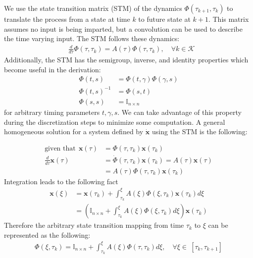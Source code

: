 We use the state transition matrix (STM) of the dynamics $\Phi(\tau_{k+1},\tau_k)$ to translate the process from a state at time $k$ to future state at $k+1$. This matrix assumes no input is being imparted, but a convolution can be used to describe the time varying input. The STM follows these dynamics:
%
\begin{align}
& \frac{d}{d\tau} \Phi(\tau,\tau_k) = A(\tau) \Phi(\tau,\tau_k), \quad \forall k \in \mathcal{K}
\end{align}
Additionally, the STM has the semigroup, inverse, and identity properties which become useful in the derivation:
\begin{align}
	\Phi(t,s) &= \Phi(t, \gamma)\Phi(\gamma, s) \\
	\Phi(t,s)^{-1} &= \Phi(s,t) \\
	\Phi(s,s) &= \mathbb{I}_{n \times n}
\end{align}
for arbitrary timing parameters $t, \gamma, s$. We can take advantage of this property during the discretization steps to minimize some computation. A general homogeneous solution for a system defined by $\dot{\mathbf{x}}$ using the STM is the following:

\begin{align}
	\text{given that} \ \ \mathbf{x}(\tau) &= \Phi(\tau, \tau_k) \mathbf{x}(\tau_k)\\
	\frac{d}{d\tau}\mathbf{x}(\tau) &= \dot{\Phi}(\tau, \tau_k) \mathbf{x}(\tau_k) = A(\tau)\mathbf{x}(\tau) \\ 
	& = A(\tau) \Phi(\tau, \tau_k) \mathbf{x}(\tau_k)
\end{align}
Integration leads to the following fact
\begin{align}
	\mathbf{x}(\xi) &= \mathbf{x}(\tau_k) + \int_{\tau_k}^\xi A(\xi) \Phi(\xi, \tau_k) \mathbf{x}(\tau_k) d\xi \\
	&= \left( \mathbb{I}_{n\times n} + \int_{\tau_k}^\xi A(\xi) \Phi(\xi, \tau_k) d\xi \right)  \mathbf{x}(\tau_k)
\end{align}
Therefore the arbitrary state transition mapping from time $\tau_k$ to $\xi$ can be represented as the following:
\begin{align}
	\Phi(\xi, \tau_k) = \mathbb{I}_{n\times n} + \int_{\tau_k}^\xi A(\xi) \Phi(\tau, \tau_k) d\xi, \quad \forall \xi \in \ [\tau_k, \tau_{k+1}]
\end{align}

